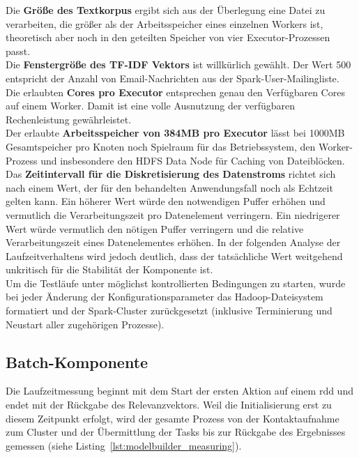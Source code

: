 Die \textbf{Größe des Textkorpus} ergibt sich aus der Überlegung eine Datei zu verarbeiten, die größer als der Arbeitsspeicher eines einzelnen Workers ist, theoretisch aber noch in den geteilten Speicher von vier Executor-Prozessen passt.\\

Die \textbf{Fenstergröße des TF-IDF Vektors} ist willkürlich gewählt. Der Wert 500 entspricht der Anzahl von Email-Nachrichten aus der Spark-User-Mailingliste.\\

Die erlaubten \textbf{Cores pro Executor} entsprechen genau den Verfügbaren Cores auf einem Worker. Damit ist eine volle Ausnutzung der verfügbaren Rechenleistung gewährleistet.\\

Der erlaubte \textbf{Arbeitsspeicher von 384MB pro Executor} lässt bei 1000MB Gesamtspeicher pro Knoten noch Spielraum für das Betriebssystem, den Worker-Prozess und insbesondere den HDFS Data Node für Caching von Dateiblöcken.\\

Das \textbf{Zeitintervall für die Diskretisierung des Datenstroms} richtet sich nach einem Wert, der für den behandelten Anwendungsfall noch als Echtzeit gelten kann.
Ein höherer Wert würde den notwendigen Puffer erhöhen und vermutlich die Verarbeitungszeit pro Datenelement verringern. Ein niedrigerer Wert würde vermutlich den nötigen Puffer verringern und die relative Verarbeitungszeit eines Datenelementes erhöhen. In der folgenden Analyse der Laufzeitverhaltens wird jedoch deutlich, dass der tatsächliche Wert weitgehend unkritisch für die Stabilität der Komponente ist.\\

Um die Testläufe unter möglichst kontrollierten Bedingungen zu starten, wurde bei jeder Änderung der Konfigurationsparameter das Hadoop-Dateisystem formatiert und der Spark-Cluster zurückgesetzt (inklusive Terminierung und Neustart aller zugehörigen Prozesse).

\subsection{Batch-Komponente}

Die Laufzeitmessung beginnt mit dem Start der ersten Aktion auf einem \gls{rdd} und endet mit der Rückgabe des Relevanzvektors.
Weil die Initialisierung erst zu diesem Zeitpunkt erfolgt, wird der gesamte Prozess von der Kontaktaufnahme zum Cluster und der Übermittlung der Tasks bis zur Rückgabe des Ergebnisses gemessen (siehe Listing~\ref{lst:modelbuilder_measuring}).\\

